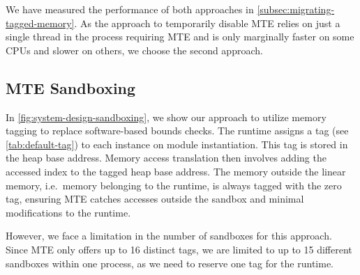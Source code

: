 \noindent
We have measured the performance of both approaches in \cref{subsec:migrating-tagged-memory}.
As the approach to temporarily disable \ac{MTE} relies on just a single thread in the process requiring \ac{MTE} and is only marginally faster on some CPUs and slower on others, we choose the second approach.

\subsection{\ac{MTE} Sandboxing}
\label{subsec:bounds-checks}

In \cref{fig:system-design-sandboxing}, we show our approach to utilize memory tagging to replace software-based bounds checks.
The runtime assigns a tag (see \cref{tab:default-tag}) to each instance on module instantiation.
This tag is stored in the heap base address.
Memory access translation then involves adding the accessed index to the tagged heap base address.
The memory outside the linear memory, i.e.\ memory belonging to the runtime, is always tagged with the zero tag, ensuring \ac{MTE} catches accesses outside the sandbox and minimal modifications to the runtime.

However, we face a limitation in the number of sandboxes for this approach.
Since \ac{MTE} only offers up to 16 distinct tags, we are limited to up to 15 different sandboxes within one process, as we need to reserve one tag for the runtime.


